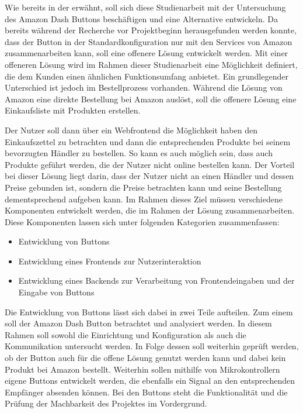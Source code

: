Wie bereits in der  erwähnt, soll sich diese Studienarbeit mit der Untersuchung des Amazon Dash Buttons beschäftigen und eine Alternative entwickeln. Da bereits während der Recherche vor Projektbeginn herausgefunden werden konnte, dass der Button in der Standardkonfiguration nur mit den Services von Amazon zusammenarbeiten kann, soll eine offenere Lösung entwickelt werden. Mit einer offeneren Lösung wird im Rahmen dieser Studienarbeit eine Möglichkeit definiert, die dem Kunden einen ähnlichen Funktionsumfang anbietet. Ein grundlegender Unterschied ist jedoch im Bestellprozess vorhanden. Während die Lösung von Amazon eine direkte Bestellung bei Amazon auslöst, soll die offenere Lösung eine Einkaufsliste mit Produkten erstellen. 

Der Nutzer soll dann über ein Webfrontend die Möglichkeit haben den Einkaufszettel zu betrachten und dann die entsprechenden Produkte bei seinem bevorzugten Händler zu bestellen. So kann es auch möglich sein, dass auch Produkte geführt werden, die der Nutzer nicht online bestellen kann. Der Vorteil bei dieser Lösung liegt darin, dass der Nutzer nicht an einen Händler und dessen Preise gebunden ist, sondern die Preise betrachten kann und seine Bestellung dementsprechend aufgeben kann. 
Im Rahmen dieses Ziel müssen verschiedene Komponenten entwickelt werden, die im Rahmen der Lösung zusammenarbeiten. Diese Komponenten lassen sich unter folgenden Kategorien zusammenfassen:
\begin{itemize}
\item Entwicklung von Buttons 
\item Entwicklung eines Frontends zur Nutzerinteraktion
\item Entwicklung eines Backends zur Verarbeitung von Frontendeingaben und der Eingabe von Buttons 
\end{itemize}
Die Entwicklung von Buttons lässt sich dabei in zwei Teile aufteilen. Zum einem soll der Amazon Dash Button betrachtet und analysiert werden. In diesem Rahmen soll sowohl die Einrichtung und Konfiguration als auch die Kommunikation untersucht werden. In Folge dessen soll weiterhin geprüft werden, ob der Button auch für die offene Lösung genutzt werden kann und dabei kein Produkt bei Amazon bestellt. Weiterhin sollen mithilfe von Mikrokontrollern eigene Buttons entwickelt werden, die ebenfalls ein Signal an den entsprechenden Empfänger absenden können. Bei den Buttons steht die Funktionalität und die Prüfung der Machbarkeit des Projektes im Vordergrund.


